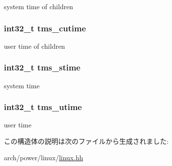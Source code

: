 system time of children \hypertarget{structPowerLinux_1_1tms_a1a6cb5b8afe4daa7206ed2483504f546}{
\subsubsection[{tms\_\-cutime}]{\setlength{\rightskip}{0pt plus 5cm}int32\_\-t {\bf tms\_\-cutime}}}
\label{structPowerLinux_1_1tms_a1a6cb5b8afe4daa7206ed2483504f546}


user time of children \hypertarget{structPowerLinux_1_1tms_a8538f2f33ab27e739791168aae55f252}{
\subsubsection[{tms\_\-stime}]{\setlength{\rightskip}{0pt plus 5cm}int32\_\-t {\bf tms\_\-stime}}}
\label{structPowerLinux_1_1tms_a8538f2f33ab27e739791168aae55f252}


system time \hypertarget{structPowerLinux_1_1tms_ab653476c9f49aba7c1c0a2b3bf0ea5bf}{
\subsubsection[{tms\_\-utime}]{\setlength{\rightskip}{0pt plus 5cm}int32\_\-t {\bf tms\_\-utime}}}
\label{structPowerLinux_1_1tms_ab653476c9f49aba7c1c0a2b3bf0ea5bf}


user time 

この構造体の説明は次のファイルから生成されました:\begin{DoxyCompactItemize}
\item 
arch/power/linux/\hyperlink{arch_2power_2linux_2linux_8hh}{linux.hh}\end{DoxyCompactItemize}
